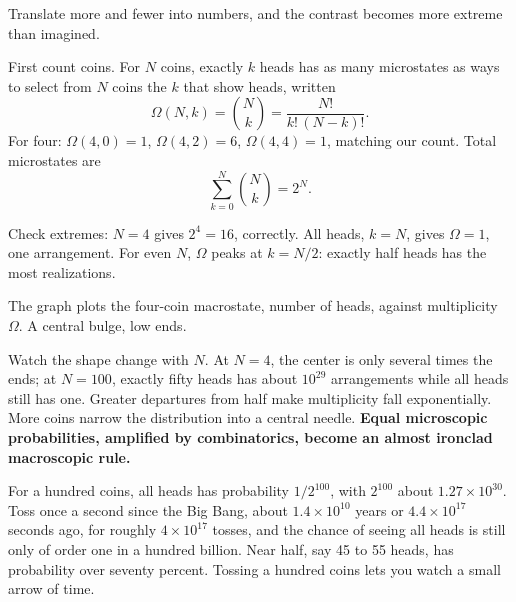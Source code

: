 
Translate more and fewer into numbers, and the contrast becomes more extreme than imagined.

First count coins. For \(N\) coins, exactly \(k\) heads has as many microstates as ways to select from \(N\) coins the \(k\) that show heads, written
\[
\Omega(N,k)=\binom{N}{k}=\frac{N!}{k!\,(N-k)!}.
\]
For four: \(\Omega(4,0)=1\), \(\Omega(4,2)=6\), \(\Omega(4,4)=1\), matching our count. Total microstates are
\[
\sum_{k=0}^{N}\binom{N}{k}=2^{N}.
\]

Check extremes: \(N=4\) gives \(2^4=16\), correctly. All heads, \(k=N\), gives \(\Omega=1\), one arrangement. For even \(N\), \(\Omega\) peaks at \(k=N/2\): exactly half heads has the most realizations.

The graph plots the four-coin macrostate, number of heads, against multiplicity \(\Omega\). A central bulge, low ends.

\begin{center}
\end{center}

Watch the shape change with \(N\). At \(N=4\), the center is only several times the ends; at \(N=100\), exactly fifty heads has about \(10^{29}\) arrangements while all heads still has one. Greater departures from half make multiplicity fall exponentially. More coins narrow the distribution into a central needle. \textbf{Equal microscopic probabilities, amplified by combinatorics, become an almost ironclad macroscopic rule.}

For a hundred coins, all heads has probability \(1/2^{100}\), with \(2^{100}\) about \(1.27\times10^{30}\). Toss once a second since the Big Bang, about \(1.4\times10^{10}\) years or \(4.4\times10^{17}\) seconds ago, for roughly \(4\times10^{17}\) tosses, and the chance of seeing all heads is still only of order one in a hundred billion. Near half, say 45 to 55 heads, has probability over seventy percent. Tossing a hundred coins lets you watch a small arrow of time.

